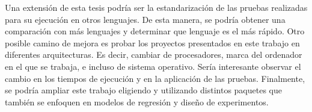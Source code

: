 Una extensión de esta tesis podría ser la estandarización de las pruebas realizadas para su ejecución en otros lenguajes. De esta manera, se podría obtener una comparación con más lenguajes y determinar que lenguaje es el más rápido. Otro posible camino de mejora es probar los proyectos presentados en este trabajo en diferentes arquitecturas. Es decir, cambiar de procesadores, marca del ordenador en el que se trabaja, e incluso de sistema operativo. Sería interesante observar el cambio en los tiempos de ejecución y en la aplicación de las pruebas. Finalmente, se podría ampliar este trabajo eligiendo y utilizando distintos paquetes que también se enfoquen en modelos de regresión y diseño de experimentos. 





